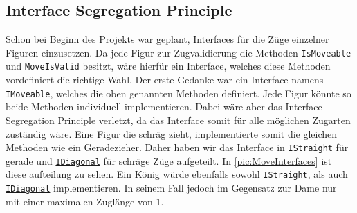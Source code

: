 \documentclass[
10pt, %
a4paper, %
oneside, %
headinclude,footinclude, %
BCOR5mm, %
]{scrartcl}
\begin{document}
\begin{onehalfspace}
\subsection{Interface Segregation Principle}
Schon bei Beginn des Projekts war geplant, Interfaces für die Züge einzelner Figuren einzusetzen. Da jede Figur zur Zugvalidierung die Methoden \texttt{IsMoveable} und \texttt{MoveIsValid} besitzt, wäre hierfür ein Interface, welches diese Methoden vordefiniert die richtige Wahl. Der erste Gedanke war ein Interface namens \texttt{IMoveable}, welches die oben genannten Methoden definiert. Jede Figur könnte so beide Methoden individuell implementieren. Dabei wäre aber das Interface Segregation Principle verletzt, da das Interface somit für alle möglichen Zugarten zuständig wäre. Eine Figur die schräg zieht, implementierte somit die gleichen Methoden wie ein Geradezieher. Daher haben wir das Interface in \texttt{\href{https://github.com/schmida736/Chess-AdvancedSE/blob/main/Chess-AdvancedSE/Game\%20Elements/Pieces/IStraight.cs}{IStraight}} für gerade und \texttt{\href{https://github.com/schmida736/Chess-AdvancedSE/blob/main/Chess-AdvancedSE/Game\%20Elements/Pieces/IDiagonal.cs}{IDiagonal}} für schräge Züge aufgeteilt. In \autoref{pic:MoveInterfaces} ist diese aufteilung zu sehen. Ein König würde ebenfalls sowohl \texttt{\href{https://github.com/schmida736/Chess-AdvancedSE/blob/main/Chess-AdvancedSE/Game\%20Elements/Pieces/IStraight.cs}{IStraight}}, als auch \texttt{\href{https://github.com/schmida736/Chess-AdvancedSE/blob/main/Chess-AdvancedSE/Game\%20Elements/Pieces/IDiagonal.cs}{IDiagonal}} implementieren. In seinem Fall jedoch im Gegensatz zur Dame nur mit einer maximalen Zuglänge von $1$.


\end{onehalfspace}
\end{document}
